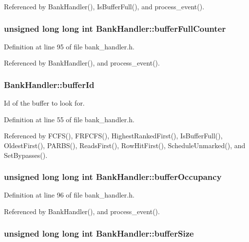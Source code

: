 Referenced by BankHandler(), IsBufferFull(), and process\_\-event().
\subsubsection[{bufferFullCounter}]{\setlength{\rightskip}{0pt plus 5cm}unsigned long long int {\bf BankHandler::bufferFullCounter}}\label{classBankHandler_0852159340fa8ed3cd24a3efd5e71523}




Definition at line 95 of file bank\_\-handler.h.

Referenced by BankHandler(), and process\_\-event().
\subsubsection[{bufferId}]{ {\bf BankHandler::bufferId}}\label{classBankHandler_59b546897a3e01e008c96baf74bf8c81}


Id of the buffer to look for. 



Definition at line 55 of file bank\_\-handler.h.

Referenced by FCFS(), FRFCFS(), HighestRankedFirst(), IsBufferFull(), OldestFirst(), PARBS(), ReadsFirst(), RowHitFirst(), ScheduleUnmarked(), and SetBypasses().
\subsubsection[{bufferOccupancy}]{\setlength{\rightskip}{0pt plus 5cm}unsigned long long int {\bf BankHandler::bufferOccupancy}}\label{classBankHandler_bc0330e0fe0f24b18f17047ee794ea4b}




Definition at line 96 of file bank\_\-handler.h.

Referenced by BankHandler(), and process\_\-event().
\subsubsection[{bufferSize}]{\setlength{\rightskip}{0pt plus 5cm}unsigned long long int {\bf BankHandler::bufferSize}}\label{classBankHandler_3ed4586984bfdc05e77334bccbe55d0d}





